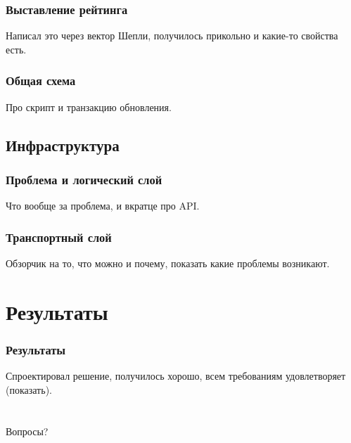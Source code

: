 \documentclass[11pt,handout,pdf,hyperref={unicode}]{beamer}
\begin{document}
\begin{frame}
  \frametitle{Выставление рейтинга}

  Написал это через вектор Шепли, получилось прикольно и какие-то
  свойства есть.
\end{frame}

\begin{frame}
  \frametitle{Общая схема}

  Про скрипт и транзакцию обновления.
\end{frame}

\subsection{Инфраструктура}

\begin{frame}
  \frametitle{Проблема и логический слой}

  Что вообще за проблема, и вкратце про API.
\end{frame}

\begin{frame}
  \frametitle{Транспортный слой}

  Обзорчик на то, что можно и почему, показать какие проблемы возникают.
\end{frame}

\section{Результаты}

\begin{frame}
  \frametitle{Результаты}

  Спроектировал решение, получилось хорошо, всем требованиям удовлетворяет (показать).
\end{frame}

\section{}

\begin{frame}

  \begin{center}
    \Huge Вопросы?
  \end{center}

\end{frame}
\end{document}
